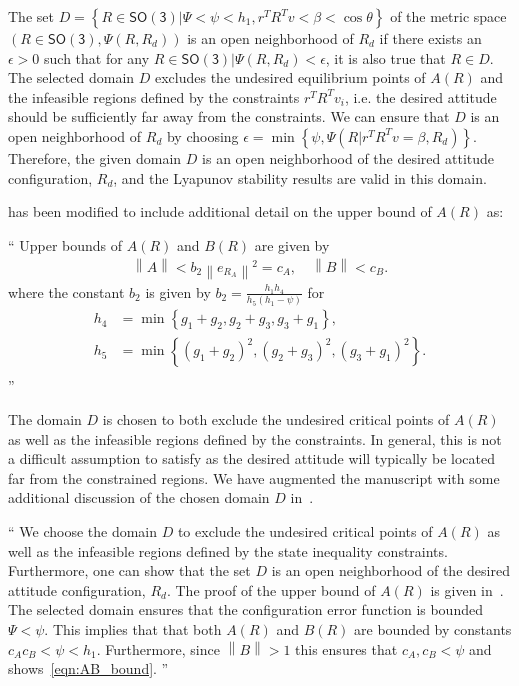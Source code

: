 \documentclass[11pt]{article}
\newcommand{\norm}[1]{\ensuremath{\left\| #1 \right\|}}
\newcommand{\braces}[1]{\ensuremath{\left\{ #1 \right\}}}
\newcommand{\parenth}[1]{\ensuremath{\left( #1 \right)}}
\newcommand{\SO}{\ensuremath{\mathsf{SO(3)}}}
\newenvironment{correction}{\begin{list}{}{\setlength{\leftmargin}{1cm}\setlength{\rightmargin}{1cm}}\vspace{\parsep}\item[]``}{''\end{list}}
\begin{document}
\begin{enumerate}
The set \( D = \braces{R \in \SO \vert \Psi < \psi < h_1, r^T R^T v < \beta < \cos \theta} \) of the metric space \( \parenth{R \in \SO, \Psi(R,R_d)} \) is an open neighborhood of \( R_d \) if there exists an \( \epsilon > 0 \) such that for any \( R \in \SO | \Psi(R,R_d) < \epsilon \), it is also true that \( R \in D \).
The selected domain \( D \) excludes the undesired equilibrium points of \( A(R) \) and the infeasible regions defined by the constraints \( r^T R^T v_i \), i.e. the desired attitude should be sufficiently far away from the constraints. 
We can ensure that \( D \) is an open neighborhood of \( R_d \) by choosing \( \epsilon = \min \braces{\psi, \Psi(R|r^T R^T v = \beta,R_d)}\).
Therefore, the given domain \( D \) is an open neighborhood of the desired attitude configuration, \(R_d\), and the Lyapunov stability results are valid in this domain.

 has been modified to include additional detail on the upper bound of \( A(R) \) as:
\begin{correction}
    Upper bounds of \( A(R) \) and \( B(R) \) are given by
    \begin{gather}
        \norm{A} < b_2 \norm{e_{R_A}}^2 = c_A  , \quad \norm{B} < c_B . 
    \end{gather}
  where the constant \( b_2\) is given by \( b_2 = \frac{h_1 h_4}{h_5 \parenth{h_1 - \psi}}\) for
  \begin{align*}
    h_4 &= \min\braces{g_1 + g_2, g_2 + g_3 , g_3 + g_1} ,\\
    h_5 &= \min\braces{\parenth{g_1 + g_2}^2,\parenth{g_2 + g_3}^2 , \parenth{g_3 + g_1}^2} .\\
  \end{align*}
\end{correction}

The domain \( D \) is chosen to both exclude the undesired critical points of \( A(R)\) as well as the infeasible regions defined by the constraints. 
In general, this is not a difficult assumption to satisfy as the desired attitude will typically be located far from the constrained regions.
We have augmented the manuscript with some additional discussion of the chosen domain \( D \) in~.

\begin{correction}
    We choose the domain \( D \) to exclude the undesired critical points of \( A(R) \) as well as the infeasible regions defined by the state inequality constraints. 
    Furthermore, one can show that the set \( D \) is an open neighborhood of the desired attitude configuration, \( R_d\).
    The proof of the upper bound of \( A(R) \) is given in~\cite{LeeITCST13}.
    The selected domain ensures that the configuration error function is bounded \( \Psi < \psi \).
    This implies that that both \( A(R) \) and \( B(R) \) are bounded by constants \( c_A c_B < \psi < h_1\).
    Furthermore, since \( \norm{B} > 1 \) this ensures that \( c_A, c_B < \psi\) and shows~\cref{eqn:AB_bound}.
\end{correction}


\end{enumerate}
\end{document}
